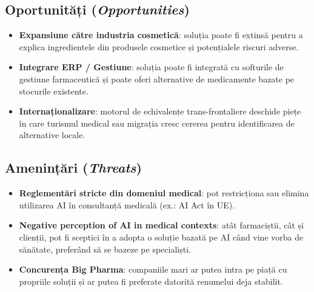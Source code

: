 \subsection{Oportunități (\textit{Opportunities})}
\begin{itemize}
    \item \textbf{Expansiune către industria cosmetică}: soluția poate fi extinsă pentru a explica ingredientele din produsele cosmetice și potențialele riscuri adverse.
    \item \textbf{Integrare ERP / Gestiune}: soluția poate fi integrată cu softurile de gestiune farmaceutică și poate oferi alternative de medicamente bazate pe stocurile existente.
    \item \textbf{Internaționalizare}: motorul de echivalențe trans-frontaliere deschide piețe în care turismul medical sau migrația cresc cererea pentru identificarea de alternative locale.
\end{itemize}

\subsection{Amenințări (\textit{Threats})}
\begin{itemize}
    \item \textbf{Reglementări stricte din domeniul medical}: pot restricționa sau elimina utilizarea AI în consultanță medicală (ex.: AI Act în UE).
    \item \textbf{Negative perception of AI in medical contexts}: atât farmaciștii, cât și clienții, pot fi sceptici în a adopta o soluție bazată pe AI când vine vorba de sănătate, preferând să se bazeze pe specialiști.
    \item \textbf{Concurența Big Pharma}: companiile mari ar putea intra pe piață cu propriile soluții și ar putea fi preferate datorită renumelui deja stabilit.
\end{itemize}
